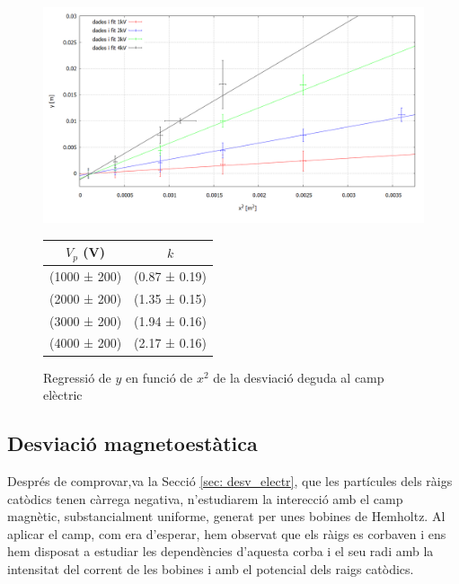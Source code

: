 \documentclass[11pt]{article}
\begin{document}
\begin{figure}[h]
    \centering
    \begin{minipage}{0.45\textwidth}
    \centering
        \includegraphics[width=1\linewidth]{Plot yvsx.PNG}
        \caption{Regressió de $y$ en funció de $x^2$  de la desviació deguda al camp elèctric}
        \label{fig: Regressió Desv E}
    \end{minipage}
    \hfill
    \begin{minipage}{0.45\textwidth} 
        \centering
        \begin{tabular}{|c|c|}
            \hline
            $V_p$ (V)	&	$k$	\\\hline
            (1000 ± 200)	&	(0.87 ± 0.19)   \\\hline
            (2000 ± 200)	&	(1.35 ± 0.15)	\\\hline
            (3000 ± 200)	&	(1.94 ± 0.16)	\\\hline
            (4000 ± 200)	&	(2.17 ± 0.16)	\\\hline           
        \end{tabular}
        \label{tab:kvsVp}
    \end{minipage}
\end{figure}

\subsection{Desviació magnetoestàtica}\label{sec: desv_magn}
Després de comprovar,va la Secció \ref{sec: desv_electr}, que les partícules dels ràigs catòdics tenen càrrega negativa, n'estudiarem la interecció amb el camp magnètic, substancialment uniforme, generat per unes bobines de Hemholtz. 
Al aplicar el camp, com era d'esperar, hem observat que els ràigs es corbaven i ens hem disposat a estudiar les dependències d'aquesta corba i el seu radi amb la intensitat del corrent de les bobines i amb el potencial dels raigs catòdics.
\end{document}

